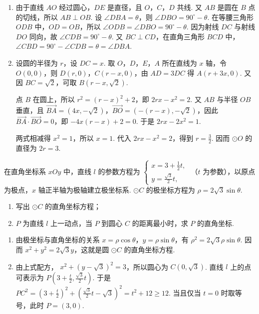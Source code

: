 \begin{solution}
\begin{enumerate}
\item 由于直线 \(AO\) 经过圆心，\(DE\) 是直径，且 \(O\)，\(C\)，\(D\) 共线. 又 \(AB\) 是圆在 \(B\) 点的切线，所以 \(AB\perp OB\). 设 \(\angle DBA=\theta\)，则
\(\angle DBO=90^{\circ}-\theta\).
在等腰三角形 \(ODB\) 中，\(OD=OB\)，所以 \(\angle ODB=\angle DBO=90^{\circ}-\theta\). 因为射线 \(DC\) 与射线 \(DO\) 同向，故 \(\angle CDB=90^{\circ}-\theta\). 又 \(BC\perp CD\)，在直角三角形 \(BCD\) 中，
\(\angle CBD=90^{\circ}-\angle CDB=\theta=\angle DBA\).

\item 设圆的半径为 \(r\)，设 \(DC=x\). 取 \(O\)，\(D\)，\(E\)，\(A\) 所在直线为 \(x\) 轴，令 \(O(0,0)\)，则
\(D(r,0)\)，\(C(r-x,0)\)，由 \(AD=3DC\) 得 \(A(r+3x,0)\). 又因 \(BC=\sqrt{2}\)，可取 \(B(r-x,\sqrt{2})\).

点 \(B\) 在圆上，所以
\(r^{2}=(r-x)^{2}+2\)，即 \(2rx-x^{2}=2\).
又 \(AB\) 与半径 \(OB\) 垂直，且
\(\overrightarrow{BA}=(4x,-\sqrt{2})\)，\(\overrightarrow{BO}=(-(r-x),-\sqrt{2})\)，因此
\(\overrightarrow{BA}\cdot\overrightarrow{BO}=0\)，即 \(-4x(r-x)+2=0\). 于是 \(2rx-2x^{2}=1\).

两式相减得 \(x^{2}=1\)，所以 \(x=1\). 代入 \(2rx-x^{2}=2\)，得到 \(r=\frac{3}{2}\). 因而 \(\odot O\) 的直径为 \(2r=3\).
\end{enumerate}
\end{solution}

\begin{problem}
在直角坐标系 \(xOy\) 中，直线 \(l\) 的参数方程为 \(\begin{cases}
x = 3 + \frac{1}{2} t,\\
y = \frac{\sqrt{3}}{2} t,
\end{cases}\) （\(t\) 为参数），以原点为极点，\(x\) 轴正半轴为极轴建立极坐标系. \(\odot C\) 的极坐标方程为 \(\rho = 2\sqrt{3}\sin \theta\).

\begin{enumerate}
\item 写出 \(\odot C\) 的直角坐标方程；
\item \(P\) 为直线 \(l\) 上一动点，当 \(P\) 到圆心 \(C\) 的距离最小时，求 \(P\) 的直角坐标.
\end{enumerate}
\end{problem}

\begin{solution}
\begin{enumerate}
\item 由极坐标与直角坐标的关系 \(x=\rho\cos\theta\)，\(y=\rho\sin\theta\)，有
\(\rho^{2}=2\sqrt{3}\rho\sin\theta\). 因而
\(x^{2}+y^{2}=2\sqrt{3}y\)，这就是圆 \(\odot C\) 的直角坐标方程.

\item 由上式配方，
\(x^{2}+(y-\sqrt{3})^{2}=3\)，所以圆心为 \(C(0,\sqrt{3})\). 直线 \(l\) 上的点可表示为
\(P\left(3+\frac{t}{2},\frac{\sqrt{3}}{2}t\right)\).
于是
\(PC^{2}=\left(3+\frac{t}{2}\right)^{2}+\left(\frac{\sqrt{3}}{2}t-\sqrt{3}\right)^{2}=t^{2}+12\geqslant12\).
当且仅当 \(t=0\) 时取等号，此时 \(P=(3,0)\).
\end{enumerate}
\end{solution}

